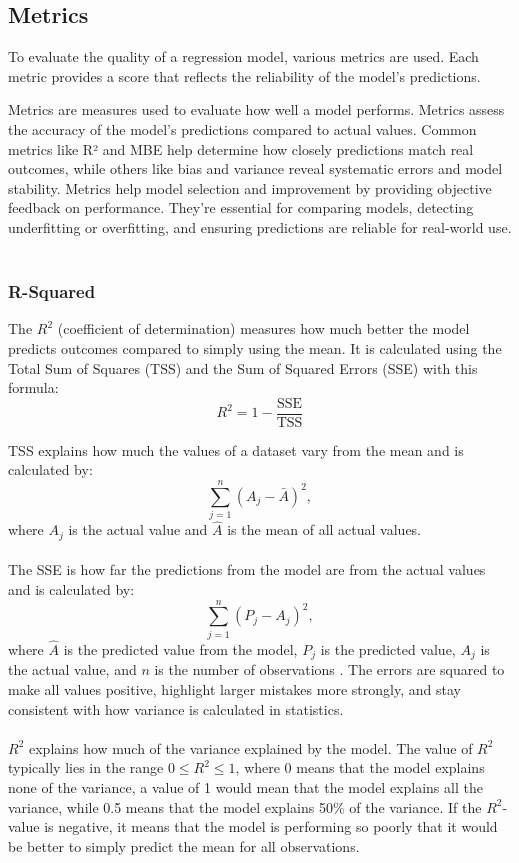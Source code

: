 \subsection{Metrics}
To evaluate the quality of a regression model, various metrics are used. Each metric provides a score that reflects the reliability of the model's predictions.

Metrics are measures used to evaluate how well a model performs. Metrics assess the accuracy of the model’s predictions compared to actual values. Common metrics like R² and MBE help determine how closely predictions match real outcomes, while others like bias and variance reveal systematic errors and model stability. Metrics help model selection and improvement by providing objective feedback on performance. They’re essential for comparing models, detecting underfitting or overfitting, and ensuring predictions are reliable for real-world use.
\\\\

\subsubsection{R-Squared}
The $R^2$ (coefficient of determination) measures how much better the model predicts outcomes compared to simply using the mean. It is calculated using the Total Sum of Squares (TSS) and the Sum of Squared Errors (SSE) with this formula: 
\begin{equation}
R^2=1-\frac{\text{SSE}}{\text{TSS}}
\end{equation}

TSS explains how much the values of a dataset vary from the mean and is calculated by: 
\begin{equation}
\sum_{j=1}^{n}(A_j - \bar{A})^2,
\end{equation}
where $A_j$ is the actual value and $\hat{A}$ is the mean of all actual values.
\\\\

\noindent The SSE is how far the predictions from the model are from the actual values and is calculated by:
\begin{equation}
	\sum_{j=1}^{n}(P_j - A_j)^2,
\end{equation}
where $\hat{A}$ is the predicted value from the model, $P_{j}$ is the predicted value, $A_{j}$ is the actual value, and $n$ is the number of observations \cite{metrics}. The errors are squared to make all values positive, highlight larger mistakes more strongly, and stay consistent with how variance is calculated in statistics.
\\\\
$R^2$ explains how much of the variance explained by the model. The value of $R^2$ typically lies in the range $0 \leq R^2 \leq 1$, where 0 means that the model explains none of the variance, a value of 1 would mean that the model explains all the variance, while 0.5 means that the model explains 50\% of the variance. If the $R^2$-value is negative, it means that the model is performing so poorly that it would be better to simply predict the mean for all observations.

